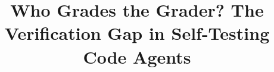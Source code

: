 \documentclass[10pt,conference]{IEEEtran}
\begin{document}
\title{Who Grades the Grader? The Verification Gap in Self-Testing Code Agents}

\maketitle
\begin{abstract}

\end{abstract}



\ifdefined\IncludeFullAppendices
\appendices

\fi
\end{document}

